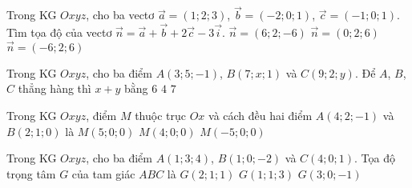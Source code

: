\begin{ex}%
Trong KG $Oxyz$, cho ba vectơ $\overrightarrow{a}=(1; 2; 3)$, $\overrightarrow{b}=(-2; 0; 1)$,  $\overrightarrow{c}=(-1; 0; 1)$. Tìm tọa độ của vectơ $\overrightarrow{n}=\overrightarrow{a}+\overrightarrow{b}+2\overrightarrow{c}-3\overrightarrow{i}$.
 {$\overrightarrow{n}=(6; 2; -6)$}
 {$\overrightarrow{n}=(0; 2; 6)$}
 {\True $\overrightarrow{n}=(-6; 2; 6)$}
\end{ex}

\begin{ex}%
Trong KG $Oxyz$, cho ba điểm $A(3; 5; -1)$, $B(7; x; 1)$ và $C(9; 2; y)$. Để $A$, $B$, $C$ thẳng hàng thì $x+y$ bằng
 {$6$}
 {$4$}
 {$7$}
\end{ex}

\begin{ex}%
Trong KG $Oxyz$, điểm $M$ thuộc trục $Ox$ và cách đều hai điểm $A(4; 2; -1)$ và $B(2; 1; 0)$ là
 {$M(5; 0; 0)$}
 {\True $M(4; 0; 0)$}
 {$M(-5; 0; 0)$}
\end{ex}

\begin{ex}%
Trong KG $Oxyz$, cho ba điểm $A(1; 3; 4)$, $B(1; 0; -2)$ và $C(4; 0; 1)$. Tọa độ trọng tâm $G$ của tam giác $ABC$ là
 {\True $G(2; 1; 1)$}
 {$G(1; 1; 3)$}
 {$G(3; 0; -1)$}
\end{ex}

